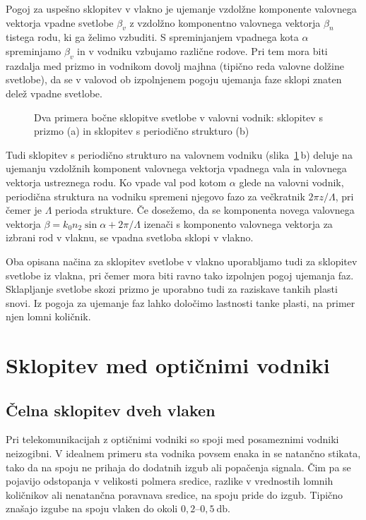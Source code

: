 Pogoj za uspešno 
sklopitev v vlakno je ujemanje vzdolžne komponente valovnega vektorja vpadne svetlobe $\beta_v$ 
z vzdolžno komponentno valovnega vektorja $\beta_n$ tistega rodu, ki ga želimo vzbuditi. 
S spreminjanjem vpadnega kota $\alpha$ spreminjamo $\beta_v$ in v vodniku vzbujamo različne rodove. 
Pri tem mora biti razdalja med prizmo in vodnikom dovolj majhna (tipično reda valovne dolžine svetlobe), 
da se v valovod ob izpolnjenem pogoju ujemanja faze sklopi znaten delež vpadne svetlobe.

\begin{figure}[h]
\centering
\def\svgwidth{140truemm} 
 
\caption{Dva primera bočne sklopitve svetlobe v valovni vodnik: sklopitev s prizmo (a) in sklopitev
s periodično strukturo (b)}
\label{fig:coupler}
\end{figure}
Tudi sklopitev s periodično strukturo na valovnem vodniku (slika~\ref{fig:coupler}\,b) deluje na 
ujemanju vzdolžnih komponent valovnega vektorja vpadnega vala in valovnega vektorja ustreznega rodu.
Ko vpade val pod kotom $\alpha$ glede na valovni vodnik, periodična struktura na vodniku 
spremeni njegovo fazo za večkratnik $2 \pi z/\Lambda$, pri čemer je $\Lambda$ perioda strukture.
Če dosežemo, da se komponenta novega valovnega vektorja $\beta = k_0 n_2 \sin \alpha+ 
2 \pi/\Lambda$ izenači s  komponento valovnega vektorja za izbrani rod v vlaknu, 
se vpadna svetloba sklopi v vlakno.

\begin{remark}
 Oba opisana načina za sklopitev svetlobe v vlakno uporabljamo tudi za sklopitev svetlobe 
 iz vlakna, pri čemer mora biti ravno tako izpolnjen pogoj ujemanja faz. 
 Sklapljanje svetlobe skozi prizmo je uporabno tudi za raziskave tankih plasti snovi. 
 Iz pogoja za ujemanje faz lahko določimo lastnosti tanke plasti, na primer njen lomni količnik. 
\end{remark}

\section{Sklopitev med optičnimi vodniki}
\subsection*{Čelna sklopitev dveh vlaken}
Pri telekomunikacijah z optičnimi vodniki so spoji med posameznimi vodniki neizogibni.
V idealnem primeru sta vodnika povsem enaka in se natančno stikata, tako da na spoju
ne prihaja do dodatnih izgub ali popačenja signala. Čim pa se pojavijo odstopanja 
v velikosti polmera sredice, razlike v vrednostih lomnih količnikov ali nenatančna poravnava 
sredice, na spoju pride do izgub. Tipično znašajo izgube na spoju vlaken do okoli 
$0,2$--$0,5~\si{\decibel}$.

